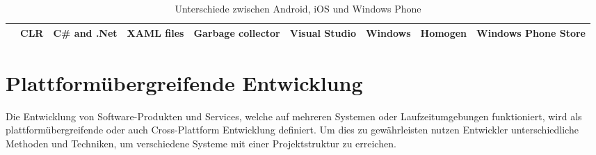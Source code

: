 \begin{table}[htbp]
{\begin{tabular}{c|c|c|c|c|c|c|c|c|}
			\multicolumn{1}{|c|}{\cellcolor[HTML]{00009B}{\color[HTML]{FFFFFF} \textbf{Windows Phone}}} & CLR                                                                        & C\# and .Net                                                               & XAML files                                                             & Garbage collector                                                         & Visual Studio                                               & Windows                                                           & Homogen                                                        & Windows Phone Store                                               \\ \hline
		\end{tabular}
	}
	\caption{Unterschiede zwischen Android, iOS und Windows Phone}
	\label{platform_differnces}
\end{table}



\chapter{Plattformübergreifende Entwicklung}
Die Entwicklung von Software-Produkten und Services, welche auf mehreren Systemen oder Laufzeitumgebungen funktioniert, wird als plattformübergreifende oder auch Cross-Plattform Entwicklung definiert. Um dies zu gewährleisten nutzen Entwickler unterschiedliche Methoden und Techniken, um verschiedene Systeme mit einer Projektstruktur zu erreichen.\citep{cross_plattform_explanation}

